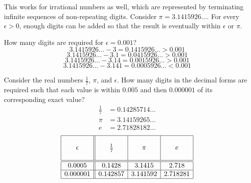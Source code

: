 \documentclass[letterpaper,12pt,fleqn]{article}
\newcommand{\e}{\epsilon}
\begin{document}
\begin{example}
  This works for irrational numbers as well, which are represented by terminating infinite sequences of
  non-repeating digits.  Consider \(\pi=3.1415926\ldots\).  For every \(\e>0\), enough digits can be added so that
  the result is eventually within \(\e\) or \(\pi\).

  \bigskip

  \begin{center}
  \end{center}

  How many digits are required for \(\e=0.001\)?
  \[3.1415926\ldots-3=0.1415926\ldots>0.001\]
  \[3.1415926\ldots-3.1=0.0415926\ldots>0.001\]
  \[3.1415926\ldots-3.14=0.0015926\ldots>0.001\]
  \[3.1415926\ldots-3.141=0.0005926\ldots<0.001\]
\end{example}

\newpage

\begin{example}
  Consider the real numbers \(\frac{1}{7}\), \(\pi\), and \(\e\).  How many digits in the decimal forms are required
  such that each value is within \(0.005\) and then \(0.000001\) of its corresponding exact value?
  \begin{align*}
    \frac{1}{7} &= 0.14285714\ldots \\
    \pi &= 3.14159265\ldots \\
    e &= 2.71828182\ldots
  \end{align*}
  \[\begin{array}{|c||c|c|c|}
  \hline
  & & & \\
  \e & \frac{1}{7} & \pi & e \\
  & & & \\
  \hline
  \hline
  0.0005 & 0.1428 & 3.1415 & 2.718 \\
  \hline
  0.000001 & 0.142857 & 3.141592 & 2.718281 \\
  \hline
  \end{array}\]
\end{example}

\bigskip
\end{document}
